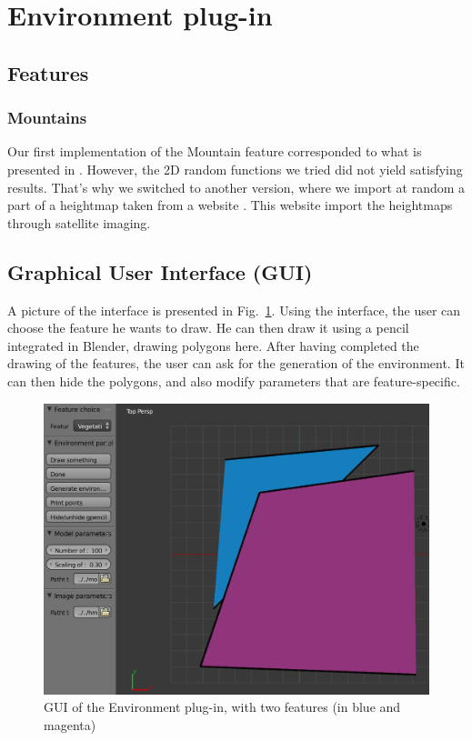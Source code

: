 \section{Environment plug-in}

\subsection{Features}

\subsubsection{Mountains}

Our first implementation of the Mountain feature corresponded to what is presented in \cite{FeatureTree}. However, the 2D random functions we tried did not yield satisfying results. That's why we switched to another version, where we import at random a part of a heightmap taken from a website \cite{terrain-party}. This website import the heightmaps through satellite imaging.

\subsection{Graphical User Interface (GUI)}

A picture of the interface is presented in Fig.~\ref{fig:env-gui1}. Using the interface, the user can choose the feature he wants to draw. He can then draw it using a pencil integrated in Blender, drawing polygons here. After having completed the drawing of the features, the user can ask for the generation of the environment. It can then hide the polygons, and also modify parameters that are feature-specific.

\begin{figure}
\includegraphics[width=\textwidth]{img/env_gui1.png}
\caption{GUI of the Environment plug-in, with two features (in blue and magenta)}
\label{fig:env-gui1}
\end{figure}


